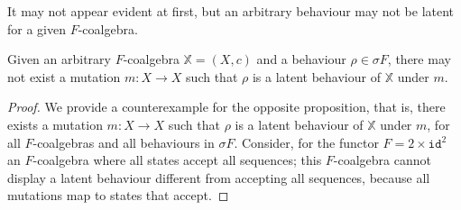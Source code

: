 It may not appear evident at first, but an arbitrary behaviour may not be latent for a given $F$-coalgebra.
\begin{proposition}
Given an arbitrary $F$-coalgebra $\mathbb{X}=(X,c)$ and a behaviour $\rho\in \sigma F$, there may not exist a mutation $m\colon X\rightarrow X$ such that $\rho$ is a latent behaviour of $\mathbb{X}$ under $m$.
\end{proposition}
\begin{proof}
We provide a counterexample for the opposite proposition, that is, there exists a mutation $m\colon X\rightarrow X$ such that $\rho$ is a latent behaviour of $\mathbb{X}$ under $m$, for all $F$-coalgebras and all behaviours in $\sigma F$. Consider, for the functor $F=2\times \texttt{id}^2$ an $F$-coalgebra where all states accept all sequences; this $F$-coalgebra cannot display a latent behaviour different from accepting all sequences, because all mutations map to states that accept.
\end{proof}

